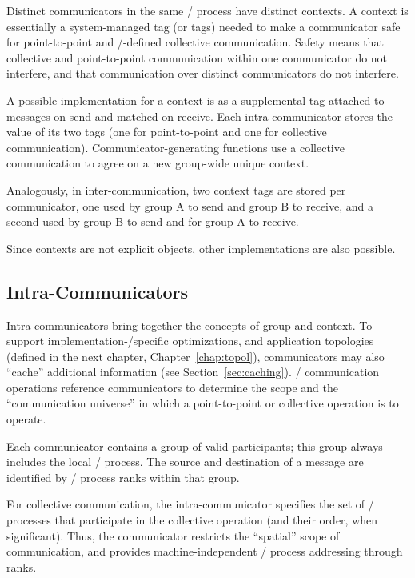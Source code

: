 \begin{implementors}
Distinct communicators in the same \MPI/ process have distinct contexts. A context
is essentially a system-managed tag (or tags) needed to make a communicator
safe for point-to-point and \MPI/-defined collective communication. Safety
means that collective and point-to-point communication within one
communicator do not interfere, and that communication over distinct
communicators do not interfere.

A possible implementation for a context is as a supplemental tag attached
to messages on send and matched on receive. Each intra-communicator stores
the value of its two tags (one for point-to-point and one for
collective communication).
Communicator-generating functions use a collective
communication to agree on a new group-wide unique context.

Analogously, in
inter-communication,
two context tags are stored per communicator, one used by
group A to send and group B to receive, and a second used by group B to
send and for group A to receive.

Since contexts are not explicit objects, other
implementations are also possible.
\end{implementors}

\subsection{Intra-Communicators}
\label{sec:context:intra-comm}
Intra-communicators bring together the concepts of group and context. To
support
implementation\hyphen/specific optimizations, and application topologies
(defined in the next chapter, Chapter~\ref{chap:topol}), communicators may
also ``cache'' additional information (see Section~\ref{sec:caching}). \MPI/
communication operations reference communicators to determine the scope and
the ``communication universe'' in which a point-to-point or collective
operation is to operate.

Each communicator contains a group of valid participants;
this group always includes the local \MPI/ process. The source and
destination of a message are identified by \MPI/ process ranks within that group.

For collective communication, the intra-communicator specifies the set of
\MPI/ processes that participate in the collective operation (and their order, when
significant). Thus, the communicator restricts the ``spatial'' scope of
communication, and provides machine-independent \MPI/ process addressing through
ranks.

